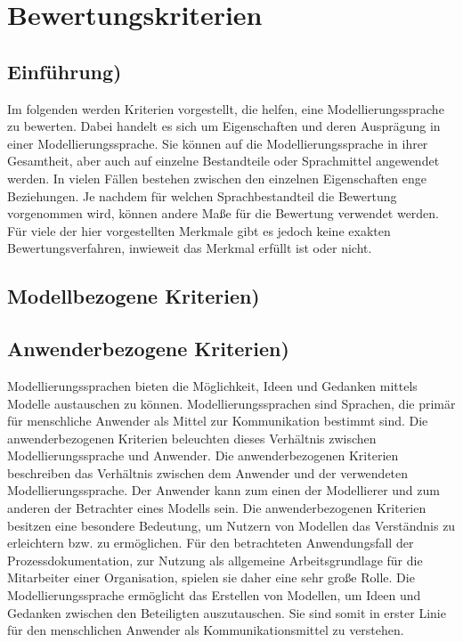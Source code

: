 

\chapter{Bewertungskriterien}

\section{Einführung)}
Im folgenden werden Kriterien vorgestellt, die helfen, eine Modellierungssprache zu bewerten. Dabei
handelt es sich um Eigenschaften und deren Ausprägung in einer Modellierungssprache. Sie können
auf die Modellierungssprache in ihrer Gesamtheit, aber auch auf einzelne Bestandteile oder Sprachmittel
angewendet werden. In vielen Fällen bestehen zwischen den einzelnen Eigenschaften enge Beziehungen.
Je nachdem für welchen Sprachbestandteil die Bewertung vorgenommen wird, können andere
Maße für die Bewertung verwendet werden. Für viele der hier vorgestellten Merkmale gibt es jedoch
keine exakten Bewertungsverfahren, inwieweit das Merkmal erfüllt ist oder nicht.


\section{Modellbezogene Kriterien)}  

 
\section{Anwenderbezogene Kriterien)}
Modellierungssprachen bieten die Möglichkeit, Ideen und Gedanken mittels Modelle austauschen zu
können. Modellierungssprachen sind Sprachen, die primär für menschliche Anwender als Mittel zur
Kommunikation bestimmt sind. Die anwenderbezogenen Kriterien beleuchten dieses Verhältnis zwischen
Modellierungssprache und Anwender.
Die anwenderbezogenen Kriterien beschreiben das Verhältnis zwischen dem Anwender und der verwendeten Modellierungssprache. Der Anwender kann zum einen der Modellierer und zum anderen der Betrachter eines Modells sein. Die anwenderbezogenen Kriterien besitzen eine besondere Bedeutung, um Nutzern von Modellen das Verständnis zu erleichtern bzw. zu ermöglichen. Für den betrachteten Anwendungsfall der Prozessdokumentation, zur Nutzung als allgemeine Arbeitsgrundlage für die Mitarbeiter einer Organisation, spielen sie daher eine sehr große Rolle. Die Modellierungssprache ermöglicht das Erstellen von Modellen, um Ideen und Gedanken zwischen den Beteiligten auszutauschen. Sie sind somit in erster Linie für den menschlichen Anwender als Kommunikationsmittel zu verstehen.  
